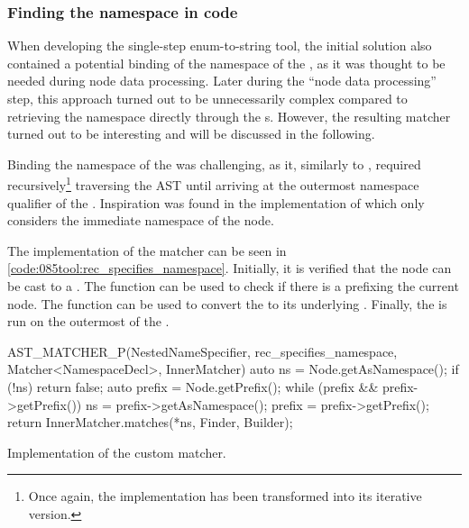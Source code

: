 \subsubsection*{Finding the namespace in code}
When developing the single-step enum-to-string tool, the initial solution also contained a potential binding of the namespace of the , as it was thought to be needed during node data processing.
Later during the ``node data processing'' step, this approach turned out to be unnecessarily complex compared to retrieving the namespace directly through the s.
However, the resulting matcher turned out to be interesting and will be discussed in the following.

Binding the namespace of the  was challenging, as it, similarly to , required recursively\footnote{
    Once again, the implementation has been transformed into its iterative version.
}
traversing the AST until arriving at the outermost namespace qualifier of the .
Inspiration was found in the implementation of  which only considers the immediate namespace of the node.

The implementation of the matcher can be seen in \cref{code:085tool:rec_specifies_namespace}. Initially, it is verified that the node can be cast to a .
The function  can be used to check if there is a  prefixing the current node.
The function  can be used to convert the  to its underlying .
Finally, the  is run on the outermost  of the .

\begin{listing}[H]
    \begin{cppcode}
AST_MATCHER_P(NestedNameSpecifier, rec_specifies_namespace, Matcher<NamespaceDecl>, InnerMatcher) {
	auto ns = Node.getAsNamespace();
	if (!ns) {
		return false;
	}
	auto prefix = Node.getPrefix();
	while (prefix && prefix->getPrefix()) {
		ns = prefix->getAsNamespace();
		prefix = prefix->getPrefix();
	}
	return InnerMatcher.matches(*ns, Finder, Builder);
}
    \end{cppcode}
    \caption{Implementation of the  custom matcher.}
    \label{code:085tool:rec_specifies_namespace}
\end{listing}

